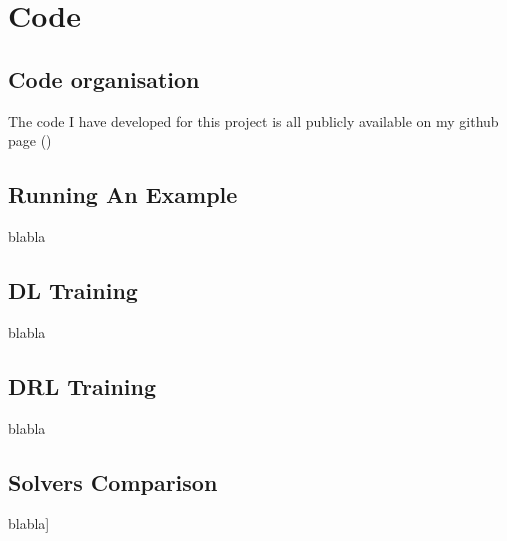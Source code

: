 
\chapter{Code} %

\label{Chapter3} %


\section{Code organisation}

The code I have developed for this project is all publicly available on my github page (\cite{FB})

\section{Running An Example}

blabla


\section{DL Training}

blabla
\section{DRL Training}

blabla


\section{Solvers Comparison}

blabla]